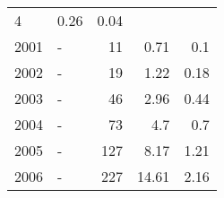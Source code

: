 \begin{longtable}{lXrrr}
       \num{4} &
       \num[round-mode=places,round-precision=2]{0,26} &
         \num[round-mode=places,round-precision=2]{0,04} \\

     2001 &
     \multicolumn{1}{X}{ -  } &


       \num{11} &
       \num[round-mode=places,round-precision=2]{0,71} &
         \num[round-mode=places,round-precision=2]{0,1} \\

     2002 &
     \multicolumn{1}{X}{ -  } &


       \num{19} &
       \num[round-mode=places,round-precision=2]{1,22} &
         \num[round-mode=places,round-precision=2]{0,18} \\

     2003 &
     \multicolumn{1}{X}{ -  } &


       \num{46} &
       \num[round-mode=places,round-precision=2]{2,96} &
         \num[round-mode=places,round-precision=2]{0,44} \\

     2004 &
     \multicolumn{1}{X}{ -  } &


       \num{73} &
       \num[round-mode=places,round-precision=2]{4,7} &
         \num[round-mode=places,round-precision=2]{0,7} \\

     2005 &
     \multicolumn{1}{X}{ -  } &


       \num{127} &
       \num[round-mode=places,round-precision=2]{8,17} &
         \num[round-mode=places,round-precision=2]{1,21} \\

     2006 &
     \multicolumn{1}{X}{ -  } &


       \num{227} &
       \num[round-mode=places,round-precision=2]{14,61} &
         \num[round-mode=places,round-precision=2]{2,16} \\


\end{longtable}
